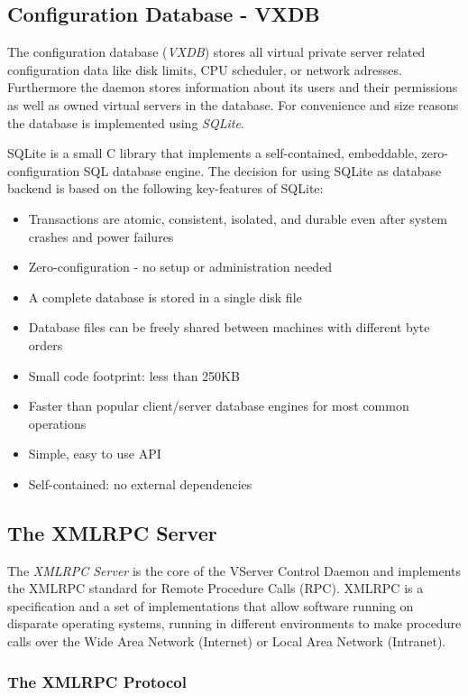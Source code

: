 \subsection{Configuration Database - VXDB}

The configuration database (\emph{VXDB}) stores all virtual private server
related configuration data like disk limits, CPU scheduler, or network
adresses. Furthermore the daemon stores information about its users and their
permissions as well as owned virtual servers in the database. For convenience
and size reasons the database is implemented using \emph{SQLite}.

SQLite is a small C library that implements a self-contained, embeddable,
zero-configuration SQL database engine. The decision for using SQLite as
database backend is based on the following key-features of SQLite:

\begin{itemize}
	\item Transactions are atomic, consistent, isolated, and durable even
		after system crashes and power failures
	\item Zero-configuration - no setup or administration needed
	\item A complete database is stored in a single disk file
	\item Database files can be freely shared between machines with different
		byte orders
	\item Small code footprint: less than 250KB
	\item Faster than popular client/server database engines for most common
		operations
	\item Simple, easy to use API
	\item Self-contained: no external dependencies
\end{itemize}

\subsection{The XMLRPC Server}

The \emph{XMLRPC Server} is the core of the VServer Control Daemon and
implements the XMLRPC standard for Remote Procedure Calls (RPC). XMLRPC is a
specification and a set of implementations that allow software running on
disparate operating systems, running in different environments to make
procedure calls over the Wide Area Network (Internet) or Local Area Network
(Intranet).


\subsubsection{The XMLRPC Protocol}

